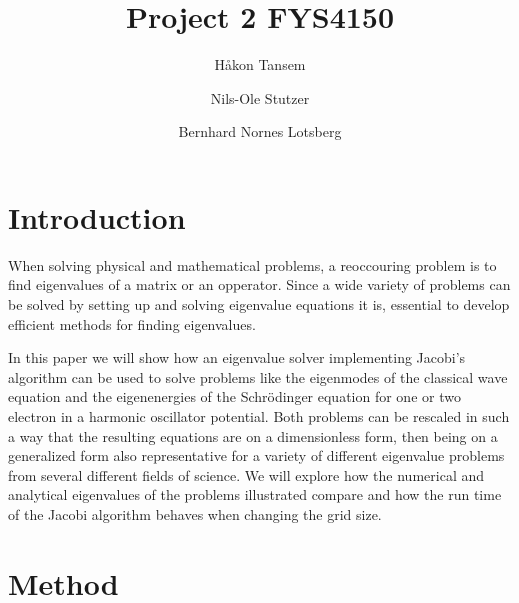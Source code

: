 \documentclass[twocolumn]{aastex62}
\begin{document}
\title{Project 2 FYS4150}




\author{Håkon Tansem}

\author{Nils-Ole Stutzer}

\author{Bernhard Nornes Lotsberg}

\begin{abstract}

\end{abstract}

\section{Introduction} \label{sec:intro}
When solving physical and mathematical problems, a reoccouring problem is to
find eigenvalues of a matrix or an opperator. Since a wide variety of problems
can be solved by setting up and solving eigenvalue equations it is, essential to
develop efficient methods for finding eigenvalues. 

In this paper we will show how an eigenvalue solver implementing Jacobi's
algorithm can be used to solve problems like the eigenmodes of the classical
wave equation and the eigenenergies of the Schrödinger equation for one or two
electron in a harmonic oscillator potential. Both problems can be rescaled in
such a way that the resulting equations are on a dimensionless form, then being
on a generalized form also representative for a variety of different eigenvalue
problems from several different fields of science. We will explore how the
numerical and analytical eigenvalues of the problems illustrated compare and how
the run time of the Jacobi algorithm behaves when changing the grid size.   

\section{Method} \label{sec:method}
\end{document}
